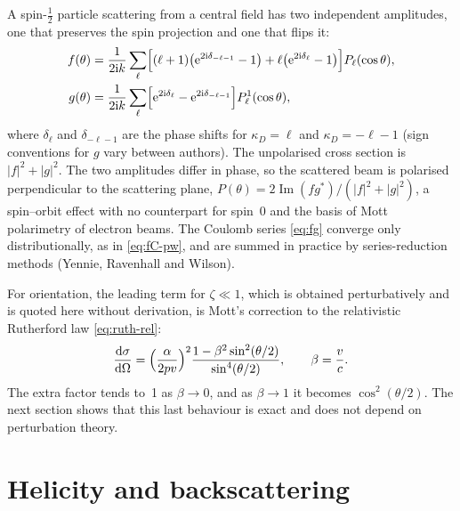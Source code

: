 \documentclass[11pt,a4paper]{book}
\numberwithin{equation}{chapter}
\newcommand{\dd}{\mathrm{d}}
\newcommand{\ii}{\mathrm{i}}
\newcommand{\ee}{\mathrm{e}}
\newcommand{\Imag}{\operatorname{Im}}
\newcommand{\dsdO}{\frac{\dd\sigma}{\dd\Omega}}
\begin{document}
A spin-$\tfrac12$ particle scattering from a central field has two independent
amplitudes, one that preserves the spin projection and one that flips it:
\begin{align}
  f(\theta)&=\frac1{2\ii k}\sum_\ell\Bigl[(\ell+1)\bigl(\ee^{2\ii\delta_{-\ell-1}}-1\bigr)
      +\ell\bigl(\ee^{2\ii\delta_\ell}-1\bigr)\Bigr]P_\ell(\cos\theta),\notag\\
  g(\theta)&=\frac1{2\ii k}\sum_\ell\Bigl[\ee^{2\ii\delta_\ell}
      -\ee^{2\ii\delta_{-\ell-1}}\Bigr]P_\ell^1(\cos\theta), \label{eq:fg}
\end{align}
where $\delta_\ell$ and $\delta_{-\ell-1}$ are the phase shifts for
$\kappa_D=\ell$ and $\kappa_D=-\ell-1$ (sign conventions for $g$ vary between
authors). The unpolarised cross section is $|f|^2+|g|^2$. The two amplitudes
differ in phase, so the scattered beam is polarised perpendicular to the
scattering plane, $P(\theta)=2\Imag(fg^*)/(|f|^2+|g|^2)$, a spin--orbit effect
with no counterpart for spin~0 and the basis of Mott polarimetry of electron
beams. The Coulomb series \eqref{eq:fg} converge only distributionally, as in
\eqref{eq:fC-pw}, and are summed in practice by series-reduction methods
(Yennie, Ravenhall and Wilson).

For orientation, the leading term for $\zeta\ll1$, which is obtained
perturbatively and is quoted here without derivation, is Mott's correction to the
relativistic Rutherford law \eqref{eq:ruth-rel}:
\begin{equation}\label{eq:mott-factor}
  \dsdO=\Bigl(\frac{\alpha}{2pv}\Bigr)^{2}
  \frac{1-\beta^2\sin^2(\theta/2)}{\sin^4(\theta/2)},\qquad\beta=\frac vc .
\end{equation}
The extra factor tends to~1 as $\beta\to0$, and as $\beta\to1$ it becomes
$\cos^2(\theta/2)$. The next section shows that this last behaviour is exact and
does not depend on perturbation theory.

\section{Helicity and backscattering}\label{sec:helicity}
\end{document}
